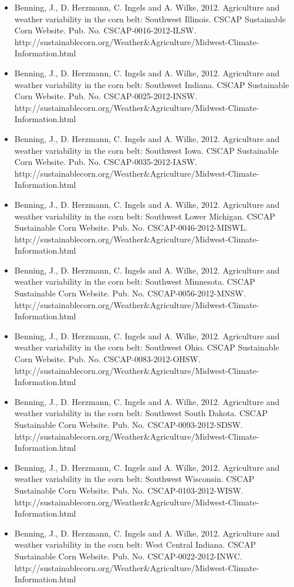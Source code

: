 \begin{itemize}
\item Benning, J., D. Herzmann, C. Ingels and A. Wilke, 2012. Agriculture and weather variability in the corn belt: Southwest Illinois. CSCAP Sustainable Corn Website. Pub. No. CSCAP-0016-2012-ILSW. http://sustainablecorn.org/Weather\&Agriculture/Midwest-Climate-Information.html
\item Benning, J., D. Herzmann, C. Ingels and A. Wilke, 2012. Agriculture and weather variability in the corn belt: Southwest Indiana. CSCAP Sustainable Corn Website. Pub. No. CSCAP-0025-2012-INSW. http://sustainablecorn.org/Weather\&Agriculture/Midwest-Climate-Information.html
\item Benning, J., D. Herzmann, C. Ingels and A. Wilke, 2012. Agriculture and weather variability in the corn belt: Southwest Iowa. CSCAP Sustainable Corn Website. Pub. No. CSCAP-0035-2012-IASW. http://sustainablecorn.org/Weather\&Agriculture/Midwest-Climate-Information.html
\item Benning, J., D. Herzmann, C. Ingels and A. Wilke, 2012. Agriculture and weather variability in the corn belt: Southwest Lower Michigan. CSCAP Sustainable Corn Website. Pub. No. CSCAP-0046-2012-MISWL. http://sustainablecorn.org/Weather\&Agriculture/Midwest-Climate-Information.html
\item Benning, J., D. Herzmann, C. Ingels and A. Wilke, 2012. Agriculture and weather variability in the corn belt: Southwest Minnesota. CSCAP Sustainable Corn Website. Pub. No. CSCAP-0056-2012-MNSW. http://sustainablecorn.org/Weather\&Agriculture/Midwest-Climate-Information.html
\item Benning, J., D. Herzmann, C. Ingels and A. Wilke, 2012. Agriculture and weather variability in the corn belt: Southwest Ohio. CSCAP Sustainable Corn Website. Pub. No. CSCAP-0083-2012-OHSW. http://sustainablecorn.org/Weather\&Agriculture/Midwest-Climate-Information.html
\item Benning, J., D. Herzmann, C. Ingels and A. Wilke, 2012. Agriculture and weather variability in the corn belt: Southwest South Dakota. CSCAP Sustainable Corn Website. Pub. No. CSCAP-0093-2012-SDSW. http://sustainablecorn.org/Weather\&Agriculture/Midwest-Climate-Information.html
\item Benning, J., D. Herzmann, C. Ingels and A. Wilke, 2012. Agriculture and weather variability in the corn belt: Southwest Wisconsin. CSCAP Sustainable Corn Website. Pub. No. CSCAP-0103-2012-WISW. http://sustainablecorn.org/Weather\&Agriculture/Midwest-Climate-Information.html
\item Benning, J., D. Herzmann, C. Ingels and A. Wilke, 2012. Agriculture and weather variability in the corn belt: West Central Indiana. CSCAP Sustainable Corn Website. Pub. No. CSCAP-0022-2012-INWC. http://sustainablecorn.org/Weather\&Agriculture/Midwest-Climate-Information.html

\end{itemize}
